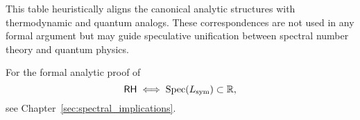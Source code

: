 \noindent
This table heuristically aligns the canonical analytic structures with thermodynamic and quantum analogs. These correspondences are not used in any formal argument but may guide speculative unification between spectral number theory and quantum physics.

\medskip
\noindent
For the formal analytic proof of
\[
\mathsf{RH} \iff \operatorname{Spec}(L_{\mathrm{sym}}) \subset \mathbb{R},
\]
see Chapter~\ref{sec:spectral_implications}.
